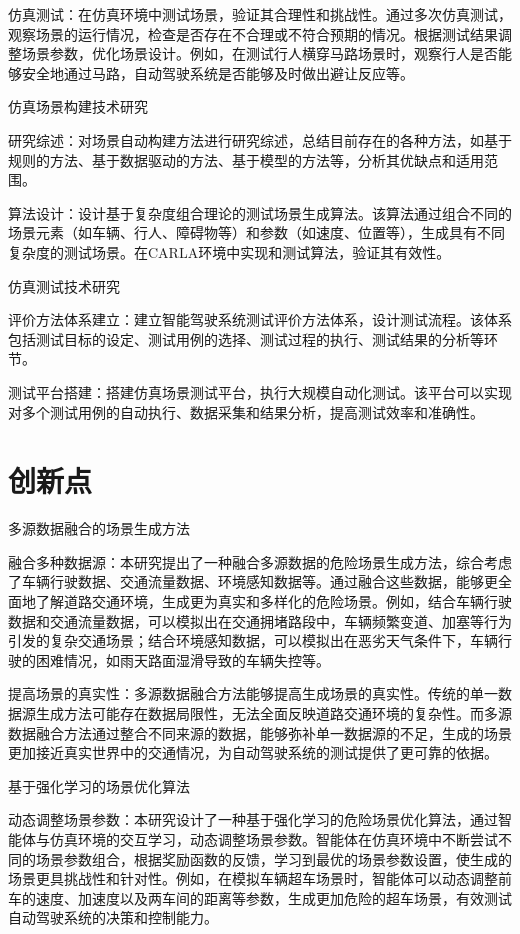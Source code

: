 仿真测试：在仿真环境中测试场景，验证其合理性和挑战性。通过多次仿真测试，观察场景的运行情况，检查是否存在不合理或不符合预期的情况。根据测试结果调整场景参数，优化场景设计。例如，在测试行人横穿马路场景时，观察行人是否能够安全地通过马路，自动驾驶系统是否能够及时做出避让反应等。

仿真场景构建技术研究

研究综述：对场景自动构建方法进行研究综述，总结目前存在的各种方法，如基于规则的方法、基于数据驱动的方法、基于模型的方法等，分析其优缺点和适用范围。

算法设计：设计基于复杂度组合理论的测试场景生成算法。该算法通过组合不同的场景元素（如车辆、行人、障碍物等）和参数（如速度、位置等），生成具有不同复杂度的测试场景。在CARLA环境中实现和测试算法，验证其有效性。

仿真测试技术研究

评价方法体系建立：建立智能驾驶系统测试评价方法体系，设计测试流程。该体系包括测试目标的设定、测试用例的选择、测试过程的执行、测试结果的分析等环节。

测试平台搭建：搭建仿真场景测试平台，执行大规模自动化测试。该平台可以实现对多个测试用例的自动执行、数据采集和结果分析，提高测试效率和准确性。



\section{创新点}

多源数据融合的场景生成方法

融合多种数据源：本研究提出了一种融合多源数据的危险场景生成方法，综合考虑了车辆行驶数据、交通流量数据、环境感知数据等。通过融合这些数据，能够更全面地了解道路交通环境，生成更为真实和多样化的危险场景。例如，结合车辆行驶数据和交通流量数据，可以模拟出在交通拥堵路段中，车辆频繁变道、加塞等行为引发的复杂交通场景；结合环境感知数据，可以模拟出在恶劣天气条件下，车辆行驶的困难情况，如雨天路面湿滑导致的车辆失控等。

提高场景的真实性：多源数据融合方法能够提高生成场景的真实性。传统的单一数据源生成方法可能存在数据局限性，无法全面反映道路交通环境的复杂性。而多源数据融合方法通过整合不同来源的数据，能够弥补单一数据源的不足，生成的场景更加接近真实世界中的交通情况，为自动驾驶系统的测试提供了更可靠的依据。

基于强化学习的场景优化算法

动态调整场景参数：本研究设计了一种基于强化学习的危险场景优化算法，通过智能体与仿真环境的交互学习，动态调整场景参数。智能体在仿真环境中不断尝试不同的场景参数组合，根据奖励函数的反馈，学习到最优的场景参数设置，使生成的场景更具挑战性和针对性。例如，在模拟车辆超车场景时，智能体可以动态调整前车的速度、加速度以及两车间的距离等参数，生成更加危险的超车场景，有效测试自动驾驶系统的决策和控制能力。

